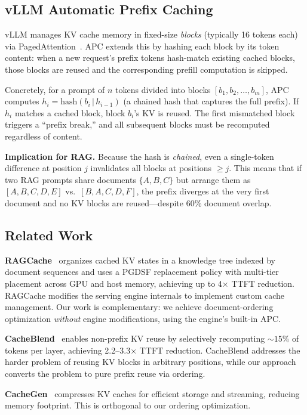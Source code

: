 \documentclass{article}
\begin{document}
\subsection{vLLM Automatic Prefix Caching}

vLLM manages KV cache memory in fixed-size \emph{blocks} (typically 16 tokens each) via PagedAttention~\citep{kwon2023pagedattention}. APC extends this by hashing each block by its token content: when a new request's prefix tokens hash-match existing cached blocks, those blocks are reused and the corresponding prefill computation is skipped.

Concretely, for a prompt of $n$ tokens divided into blocks $[b_1, b_2, \ldots, b_m]$, APC computes $h_i = \text{hash}(b_i \,|\, h_{i-1})$ (a chained hash that captures the full prefix). If $h_i$ matches a cached block, block $b_i$'s KV is reused. The first mismatched block triggers a ``prefix break,'' and all subsequent blocks must be recomputed regardless of content.

\textbf{Implication for RAG.} Because the hash is \emph{chained}, even a single-token difference at position $j$ invalidates all blocks at positions $\geq j$. This means that if two RAG prompts share documents $\{A, B, C\}$ but arrange them as $[A, B, C, D, E]$ vs.\ $[B, A, C, D, F]$, the prefix diverges at the very first document and no KV blocks are reused---despite 60\% document overlap.

\subsection{Related Work}

\textbf{RAGCache}~\citep{jin2025ragcache} organizes cached KV states in a knowledge tree indexed by document sequences and uses a PGDSF replacement policy with multi-tier placement across GPU and host memory, achieving up to 4$\times$ TTFT reduction. RAGCache modifies the serving engine internals to implement custom cache management. Our work is complementary: we achieve document-ordering optimization \emph{without} engine modifications, using the engine's built-in APC.

\textbf{CacheBlend}~\citep{yao2025cacheblend} enables non-prefix KV reuse by selectively recomputing ${\sim}15\%$ of tokens per layer, achieving 2.2--3.3$\times$ TTFT reduction. CacheBlend addresses the harder problem of reusing KV blocks in arbitrary positions, while our approach converts the problem to pure prefix reuse via ordering.

\textbf{CacheGen}~\citep{lmcache2024} compresses KV caches for efficient storage and streaming, reducing memory footprint. This is orthogonal to our ordering optimization.
\end{document}
